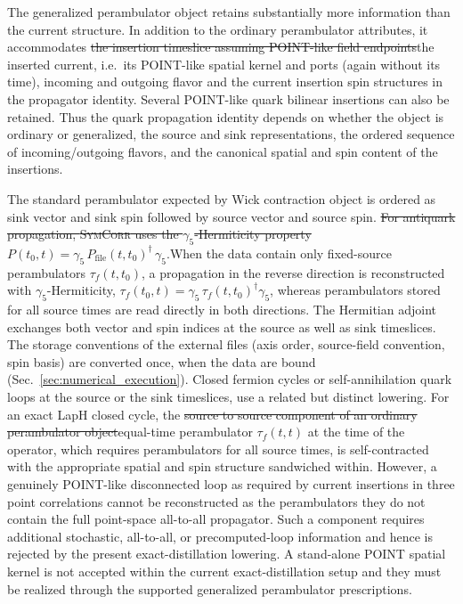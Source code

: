 \documentclass[a4paper,fleqn]{cas-dc}
\newcommand{\del}[1]{{\color{red}\sout{#1}}}
\newcommand{\add}[1]{{\color{blue}#1}}
\begin{document}
The generalized perambulator object retains substantially more information than the current structure. In addition to the ordinary perambulator attributes, it accommodates \del{the insertion timeslice assuming POINT-like field endpoints}\add{the inserted current, i.e.\ its POINT-like spatial kernel and ports (again without its time)}, incoming and outgoing flavor and the current insertion spin structures in the propagator identity. Several POINT-like quark bilinear insertions can also be retained. Thus the quark propagation identity depends on whether the object is ordinary or generalized, the source and sink representations, the ordered sequence of incoming/outgoing flavors, and the canonical spatial and spin content of the insertions. 

The standard perambulator expected by Wick contraction object is ordered as sink vector and sink spin followed by source vector and source spin. \del{For antiquark propagation, \textsc{SymCorr} uses the $\gamma_5$-Hermiticity property $P(t_0,t) = \gamma_5\, P_{\mathrm{file}}(t,t_0)^\dagger\,\gamma_5 .$}\add{When the data contain only fixed-source perambulators $\tau_f(t,t_0)$, a propagation in the reverse direction is reconstructed with $\gamma_5$-Hermiticity, $\tau_f(t_0,t)=\gamma_5\,\tau_f(t,t_0)^\dagger\gamma_5$, whereas perambulators stored for all source times are read directly in both directions.} The Hermitian adjoint exchanges both vector and spin indices at the source as well as sink timeslices. \add{The storage conventions of the external files (axis order, source-field convention, spin basis) are converted once, when the data are bound (Sec.~\ref{sec:numerical_execution}).} Closed fermion cycles or self-annihilation quark loops at the source or the sink timeslices, use a related but distinct lowering. For an exact LapH closed cycle, the \del{source to source component of an ordinary perambulator object}\add{equal-time perambulator $\tau_f(t,t)$ at the time of the operator, which requires perambulators for all source times,} is self-contracted with the appropriate spatial and spin structure sandwiched within. However, a genuinely POINT-like disconnected loop as required by current insertions in three point correlations cannot be reconstructed as the perambulators they do not contain the full point-space all-to-all propagator. Such a component requires additional stochastic, all-to-all, or precomputed-loop information and hence is rejected by the present exact-distillation lowering. A stand-alone POINT spatial kernel is not accepted within the current exact-distillation setup and they must be realized through the supported generalized perambulator prescriptions.
\end{document}
